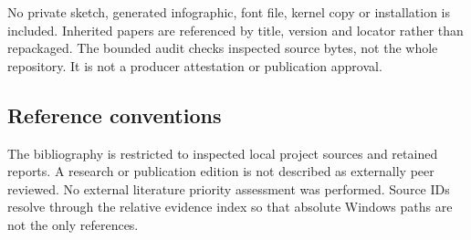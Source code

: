 \documentclass[11pt,a4paper]{article}
\begin{document}
No private sketch, generated infographic, font file, kernel copy or installation is included. Inherited papers are referenced by title, version and locator rather than repackaged. The bounded audit checks inspected source bytes, not the whole repository. It is not a producer attestation or publication approval.

\subsection*{Reference conventions}
The bibliography is restricted to inspected local project sources and retained reports. A research or publication edition is not described as externally peer reviewed. No external literature priority assessment was performed. Source IDs resolve through the relative evidence index so that absolute Windows paths are not the only references.
\end{document}
